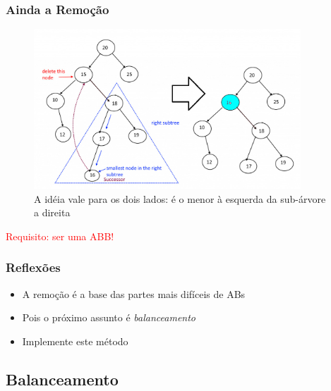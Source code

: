 \begin{frame}
\frametitle{Ainda a Remoção}

   \begin{figure}[!ht]
    \centering
    \includegraphics[keepaspectratio=true,width=10cm]{figs/fig_arvores/ex03_Delete_NODE.jpg}
 \caption{A idéia vale para os dois lados: é o menor à esquerda  da sub-árvore a direita}
    \end{figure}

\begin{flushleft}
\textcolor{red}{Requisito: ser uma ABB!}
\end{flushleft}
\end{frame}


\begin{frame}

\frametitle{Reflexões}

\begin{block}{}
\begin{itemize}
  \item A remoção é a base das partes mais difíceis de ABs
  \item Pois o próximo assunto é \textit{balanceamento}
  \item Implemente este método
\end{itemize}
\end{block}

\end{frame}


\subsection{Balanceamento}

